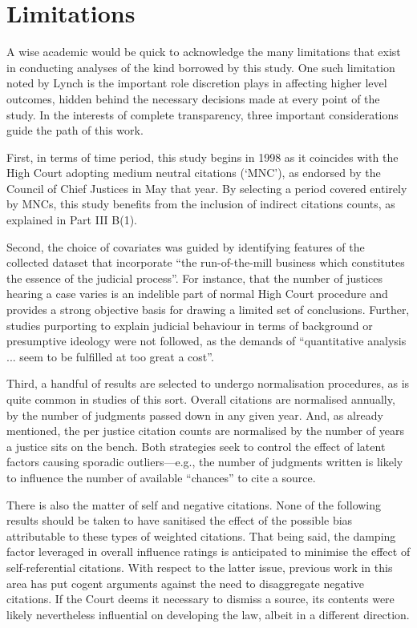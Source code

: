\let\xn\xnote
\section{Limitations}

A wise academic would be quick to acknowledge the many limitations that exist in conducting analyses of the kind borrowed by this study. One such limitation noted by Lynch is the important role discretion plays in affecting higher level outcomes, hidden behind the necessary decisions made at every point of the study.\xn{4-1} In the interests of complete transparency, three important considerations guide the path of this work.

First, in terms of time period, this study begins in 1998 as it coincides with the High Court adopting medium neutral citations (`MNC'), as endorsed by the Council of Chief Justices in May that year.\xn{4-2} By selecting a period covered entirely by MNCs, this study benefits from the inclusion of indirect citations counts, as explained in Part III B(1).

Second, the choice of covariates was guided by identifying features of the collected dataset that incorporate ``the run-of-the-mill business which constitutes the essence of the judicial process''.\xn{4-3} For instance, that the number of justices hearing a case varies is an indelible part of normal High Court procedure and provides a strong objective basis for drawing a limited set of conclusions. Further, studies purporting to explain judicial behaviour in terms of background or presumptive ideology were not followed, as the demands of ``quantitative analysis ... seem to be fulfilled at too great a cost''.\xn{4-4}

Third, a handful of results are selected to undergo normalisation procedures, as is quite common in studies of this sort.\xn{4-5} Overall citations are normalised annually, by the number of judgments passed down in any given year. And, as already mentioned, the per justice citation counts are normalised by the number of years a justice sits on the bench. Both strategies seek to control the effect of latent factors causing sporadic outliers---e.g., the number of judgments written is likely to influence the number of available ``chances'' to cite a source.

There is also the matter of self and negative citations.\xn{4-6} None of the following results should be taken to have sanitised the effect of the possible bias attributable to these types of weighted citations. That being said, the damping factor leveraged in overall influence ratings is anticipated to minimise the effect of self-referential citations. With respect to the latter issue, previous work in this area has put cogent arguments against the need to disaggregate negative citations.\xn{4-7} If the Court deems it necessary to dismiss a source, its contents were likely nevertheless influential on developing the law, albeit in a different direction.\xn{4-8}


